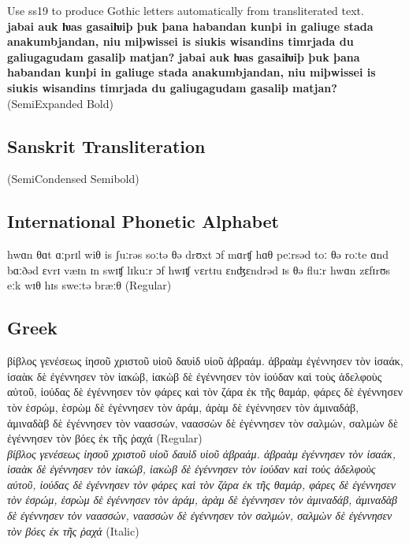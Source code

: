 \documentclass[12pt,letterpaper,openany]{book}
\begin{document}
{\noindent\small\semiconditalic Use ss19 to produce Gothic letters
  automatically from transliterated text.}\\[1ex]
{\bfseries jabai auk ƕas gasaiƕiþ þuk þana
  habandan kunþi in ga\-liuge stada anakumbjandan, niu miþwissei is
  siukis wis\-an\-dins timrjada du galiugagudam gasaliþ matjan?
  jabai auk ƕas gasaiƕiþ þuk þana habandan kunþi in
    ga\-liuge stada anakumbjandan, niu miþwissei is siukis
    wis\-an\-dins timrjada du galiugagudam gasaliþ matjan?} (SemiExpanded Bold)

  \subsection*{Sanskrit Transliteration}

 (SemiCondensed Semibold)

\subsection*{International Phonetic Alphabet}
{
{\regular hwɑn θɑt ɑːprɪl wiθ is ʃuːrəs soːtə θə drʊxt ɔf mɑrʧ hɑθ peːrsəd toː
θə roːte ɑnd bɑːðəd ɛvrɪ væɪn ɪn swɪʧ lɪkuːr ɔf hwɪʧ vɛrtɪu
ɛnʤɛndrəd ɪs θə fluːr hwɑn zɛfɪrʊs eːk wɪθ hɪs sweːtə bræːθ}} (Regular)

\subsection*{Greek}
{\regular{} βίβλος
γενέσεως ἰησοῦ χριστοῦ υἱοῦ δαυὶδ
υἱοῦ ἀβραάμ.
ἀβραὰμ
ἐγέννησεν τὸν ἰσαάκ, ἰσαὰκ δὲ ἐγέννησεν
τὸν ἰακώβ, ἰακὼβ δὲ ἐγέννησεν τὸν
ἰούδαν καὶ τοὺς ἀδελφοὺς αὐτοῦ,
ἰούδας
δὲ ἐγέννησεν τὸν φάρες καὶ τὸν ζάρα
ἐκ τῆς θαμάρ, φάρες δὲ ἐγέννησεν τὸν
ἑσρώμ, ἑσρὼμ δὲ ἐγέννησεν τὸν ἀράμ,
ἀρὰμ
δὲ ἐγέννησεν τὸν ἀμιναδάβ, ἀμιναδὰβ
δὲ ἐγέννησεν τὸν ναασσών, ναασσὼν δὲ
ἐγέννησεν τὸν σαλμών,
σαλμὼν
δὲ ἐγέννησεν τὸν βόες ἐκ τῆς ῥαχά} (Regular)\\

\noindent\textit{βίβλος
γενέσεως ἰησοῦ χριστοῦ υἱοῦ δαυὶδ
υἱοῦ ἀβραάμ.
ἀβραὰμ
ἐγέννησεν τὸν ἰσαάκ, ἰσαὰκ δὲ ἐγέννησεν
τὸν ἰακώβ, ἰακὼβ δὲ ἐγέννησεν τὸν
ἰούδαν καὶ τοὺς ἀδελφοὺς αὐτοῦ,
ἰούδας
δὲ ἐγέννησεν τὸν φάρες καὶ τὸν ζάρα
ἐκ τῆς θαμάρ, φάρες δὲ ἐγέννησεν τὸν
ἑσρώμ, ἑσρὼμ δὲ ἐγέννησεν τὸν ἀράμ,
ἀρὰμ
δὲ ἐγέννησεν τὸν ἀμιναδάβ, ἀμιναδὰβ
δὲ ἐγέννησεν τὸν ναασσών, ναασσὼν δὲ
ἐγέννησεν τὸν σαλμών,
σαλμὼν
δὲ ἐγέννησεν τὸν βόες ἐκ τῆς ῥαχά} (Italic)
\end{document}
